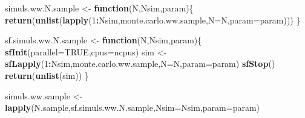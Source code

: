 \documentclass[]{book}
\newenvironment{Shaded}{\begin{snugshade}}{\end{snugshade}}
\newcommand{\ControlFlowTok}[1]{\textcolor[rgb]{0.13,0.29,0.53}{\textbf{#1}}}
\newcommand{\DataTypeTok}[1]{\textcolor[rgb]{0.13,0.29,0.53}{#1}}
\newcommand{\DecValTok}[1]{\textcolor[rgb]{0.00,0.00,0.81}{#1}}
\newcommand{\KeywordTok}[1]{\textcolor[rgb]{0.13,0.29,0.53}{\textbf{#1}}}
\newcommand{\NormalTok}[1]{#1}
\newcommand{\OperatorTok}[1]{\textcolor[rgb]{0.81,0.36,0.00}{\textbf{#1}}}
\newcommand{\OtherTok}[1]{\textcolor[rgb]{0.56,0.35,0.01}{#1}}
\newcommand{\StringTok}[1]{\textcolor[rgb]{0.31,0.60,0.02}{#1}}
\theoremstyle{definition}
\theoremstyle{definition}
\theoremstyle{definition}
\theoremstyle{remark}
\begin{document}
\begin{Shaded}
\begin{Highlighting}[]
\NormalTok{simuls.ww.N.sample <-}\StringTok{ }\ControlFlowTok{function}\NormalTok{(N,Nsim,param)\{}
  \KeywordTok{return}\NormalTok{(}\KeywordTok{unlist}\NormalTok{(}\KeywordTok{lapply}\NormalTok{(}\DecValTok{1}\OperatorTok{:}\NormalTok{Nsim,monte.carlo.ww.sample,}\DataTypeTok{N=}\NormalTok{N,}\DataTypeTok{param=}\NormalTok{param)))}
\NormalTok{\}}

\NormalTok{sf.simuls.ww.N.sample <-}\StringTok{ }\ControlFlowTok{function}\NormalTok{(N,Nsim,param)\{}
  \KeywordTok{sfInit}\NormalTok{(}\DataTypeTok{parallel=}\OtherTok{TRUE}\NormalTok{,}\DataTypeTok{cpus=}\NormalTok{ncpus)}
\NormalTok{  sim <-}\StringTok{ }\KeywordTok{sfLapply}\NormalTok{(}\DecValTok{1}\OperatorTok{:}\NormalTok{Nsim,monte.carlo.ww.sample,}\DataTypeTok{N=}\NormalTok{N,}\DataTypeTok{param=}\NormalTok{param)}
  \KeywordTok{sfStop}\NormalTok{()}
  \KeywordTok{return}\NormalTok{(}\KeywordTok{unlist}\NormalTok{(sim))}
\NormalTok{\}}

\NormalTok{simuls.ww.sample <-}\StringTok{ }\KeywordTok{lapply}\NormalTok{(N.sample,sf.simuls.ww.N.sample,}\DataTypeTok{Nsim=}\NormalTok{Nsim,}\DataTypeTok{param=}\NormalTok{param)}


\end{Highlighting}
\end{Shaded}
\end{document}
